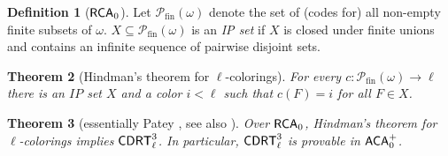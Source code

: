 \documentclass{amsart}
\newtheorem{thm}{Theorem}[section]
\theoremstyle{definition}
\newtheorem{defn}[thm]{Definition}
\theoremstyle{remark}
\newcommand{\system}[1]{\mbox{\fontfamily{cmss}\fontshape{n}\fontseries{m}%
    \selectfont#1}}
\newcommand{\RCA}{\system{RCA}\ensuremath{_0}}
\newcommand{\ACA}{\system{ACA}\ensuremath{_0}}
\newcommand{\cDRT}{\system{CDRT}}
\begin{document}
\begin{defn}[$\RCA$]
Let $\mathcal{P}_{\text{fin}}(\omega)$ denote the set of (codes for) all non-empty
finite subsets of $\omega$. $X \subseteq
\mathcal{P}_{\text{fin}}(\omega)$ is an \emph{IP set} if $X$ is closed
under finite unions and contains an infinite sequence of pairwise
disjoint sets. 
\end{defn}

\begin{thm}[Hindman's theorem for $\ell$-colorings]
	For every $c : \mathcal{P}_{\text{fin}}(\omega) \to \ell$
        there is an $IP$ set $X$ and a color $i < \ell$ such that
        $c(F) = i$ for all $F \in X$.
\end{thm}

\begin{thm}[essentially Patey \cite{patey}, see also \mbox{\cite[page 268]{cs}}]
\label{prop:hindman} Over $\RCA$,
	Hindman's theorem for $\ell$-colorings implies
        $\cDRT^3_\ell$. In particular, $\cDRT^3_\ell$ is provable in
        $\ACA^+$.
\end{thm}
\end{document}
